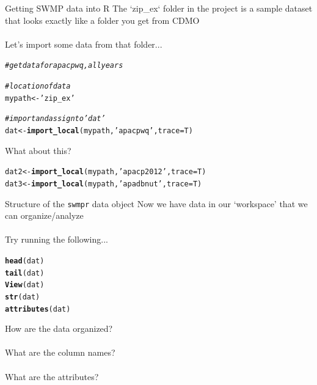 \documentclass[xcolor=dvipsnames]{beamer}\usepackage[]{graphicx}\usepackage[]{color}
\makeatletter
\newcommand{\hlstr}[1]{\textcolor[rgb]{0.192,0.494,0.8}{#1}}%
\newcommand{\hlcom}[1]{\textcolor[rgb]{0.678,0.584,0.686}{\textit{#1}}}%
\newcommand{\hlstd}[1]{\textcolor[rgb]{0.345,0.345,0.345}{#1}}%
\newcommand{\hlkwb}[1]{\textcolor[rgb]{0.69,0.353,0.396}{#1}}%
\newcommand{\hlkwc}[1]{\textcolor[rgb]{0.333,0.667,0.333}{#1}}%
\newcommand{\hlkwd}[1]{\textcolor[rgb]{0.737,0.353,0.396}{\textbf{#1}}}%
\newenvironment{kframe}{%
 \def\at@end@of@kframe{}%
 \ifinner\ifhmode%
  \def\at@end@of@kframe{\end{minipage}}%
  \begin{minipage}{\columnwidth}%
 \fi\fi%
 \def\FrameCommand##1{\hskip\@totalleftmargin \hskip-\fboxsep
 \colorbox{shadecolor}{##1}\hskip-\fboxsep
     \hskip-\linewidth \hskip-\@totalleftmargin \hskip\columnwidth}%
 \MakeFramed {\advance\hsize-\width
   \@totalleftmargin\z@ \linewidth\hsize
   \@setminipage}}%
 {\par\unskip\endMakeFramed%
 \at@end@of@kframe}
\newenvironment{knitrout}{}{} %
\makeatother
\begin{document}
\begin{frame}[fragile]{Getting SWMP data into R}
\onslide<+->
The `zip\_ex` folder in the project is a sample dataset that looks exactly like a folder you get from CDMO \\~\\
Let's import some data from that folder...
\begin{knitrout}\scriptsize
{}\color{fgcolor}\begin{kframe}
\begin{alltt}
\hlcom{# get data for apacpwq, all years}

\hlcom{# location of data}
\hlstd{mypath} \hlkwb{<-} \hlstr{'zip_ex'}

\hlcom{# import and assign to 'dat'}
\hlstd{dat} \hlkwb{<-} \hlkwd{import_local}\hlstd{(mypath,} \hlstr{'apacpwq'}\hlstd{,} \hlkwc{trace} \hlstd{= T)}
\end{alltt}
\end{kframe}
\end{knitrout}
\onslide<+->
What about this?
\begin{knitrout}\scriptsize
{}\color{fgcolor}\begin{kframe}
\begin{alltt}
\hlstd{dat2} \hlkwb{<-} \hlkwd{import_local}\hlstd{(mypath,} \hlstr{'apacp2012'}\hlstd{,} \hlkwc{trace} \hlstd{= T)}
\hlstd{dat3} \hlkwb{<-} \hlkwd{import_local}\hlstd{(mypath,} \hlstr{'apadbnut'}\hlstd{,} \hlkwc{trace} \hlstd{= T)}
\end{alltt}
\end{kframe}
\end{knitrout}

\end{frame}

\begin{frame}[fragile]{Structure of the \texttt{swmpr} data object}
\onslide<+->
Now we have data in our `workspace' that we can organize/analyze \\~\\
Try running the following...
\begin{knitrout}\scriptsize
{}\color{fgcolor}\begin{kframe}
\begin{alltt}
\hlkwd{head}\hlstd{(dat)}
\hlkwd{tail}\hlstd{(dat)}
\hlkwd{View}\hlstd{(dat)}
\hlkwd{str}\hlstd{(dat)}
\hlkwd{attributes}\hlstd{(dat)}
\end{alltt}
\end{kframe}
\end{knitrout}
\onslide<+->
How are the data organized?  \\~\\
What are the column names? \\~\\
What are the attributes? \\~\\
\end{frame}
\end{document}
